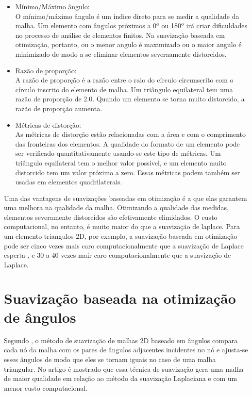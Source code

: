 \begin{itemize}
    \item Mínimo/Máximo ângulo:\\
    O mínimo/máximo ângulo é um índice direto para se medir a qualidade da malha. Um elemento com ângulos próximos a 0º ou 180º irá criar dificuldades no processo de análise de elementos finitos. Na suavização baseada em otimização, portanto, ou o menor angulo é maximizado ou o maior angulo é minimizado de modo a se eliminar elementos severaamente distorcidos.
    \item Razão de proporção:\\
    A razão de proporção é a razão entre o raio do círculo circunscrito com o círculo inscrito do elemento de malha. Um triângulo equilateral tem uma razão de proporção de 2.0. Quando um elemento se torna muito distorcido, a razão de proporção aumenta.
    \item Métricas de distorção:\\
    As métricas de distorção estão relacionadas com a área e com o comprimento das fronteiras dos elementos. A qualidade do formato de um elemento pode ser verificado quantitativamente usando-se este tipo de métricas. Um triângulo equilateral tem o melhor valor possível, e um elemento muito distorcido tem um valor próximo a zero. Essas métricas podem também ser usadas em elementos quadrilaterais.
\end{itemize}

Uma das vantagens de suavizações baseadas em otimização é a que elas garantem uma melhora na qualidade da malha. Otimizando a qualidade das medidas, elementos severamente distorcidos são efetivamente elimidados. O custo computacional, no entanto, é muito maior do que a suavização de laplace. Para um elemento triangulos 2D, por exemplo, a suavização baseada em otimização pode ser cinco vezes mais caro computacionalmente que a suavização de Laplace esperta \cite{Freitag1997OnCL}, e 30 a 40 vezes mair caro computacionalmente que a suavização de Laplace.

\section{Suavização baseada na otimização de ângulos}

Segundo \cite{Zhou}, o método de suavização de malhas 2D baseado em ângulos compara cada nó da malha com os pares de ângulos adjacentes incidentes no nó e ajusta-se esses ângulos de modo que eles se tornam iguais no caso de uma malha triangular. No artigo é mostrado que essa técnica de suavização gera uma malha de maior qualidade em relação ao método da suavização Laplaciana e com um menor custo computacional.

